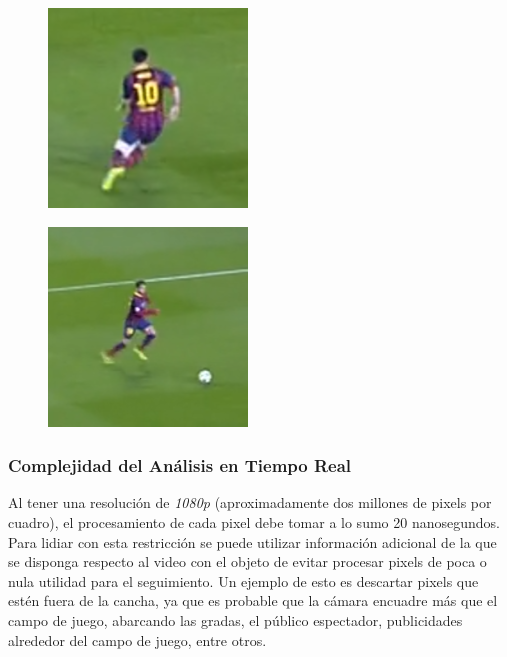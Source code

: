\begin{figure}[H]
    \begin{minipage}[t]{.5\textwidth}
        \centering
        \includegraphics[width=.4\linewidth]{./images/resize_barcelona2.png}
        \label{fig:barsa3}
    \end{minipage}%
    \begin{minipage}[t]{.5\textwidth}
        \centering
        \includegraphics[width=.4\linewidth]{./images/resize_barcelona3.png}
        \label{fig:barsa4}
    \end{minipage}
\end{figure}

\subsubsection{Complejidad del Análisis en Tiempo Real}

Al tener una resolución de \textit{1080p} (aproximadamente dos millones de
pixels por cuadro), el procesamiento de cada pixel debe tomar a lo sumo 20
nanosegundos.  Para lidiar con esta restricción se puede utilizar información
adicional de la que se disponga respecto al video con el objeto de evitar
procesar pixels de poca o nula utilidad para el seguimiento. Un ejemplo de esto
es descartar pixels que estén fuera de la cancha, ya que es probable que la
cámara encuadre más que el campo de juego, abarcando las gradas, el público
espectador, publicidades alrededor del campo de juego, entre otros.

